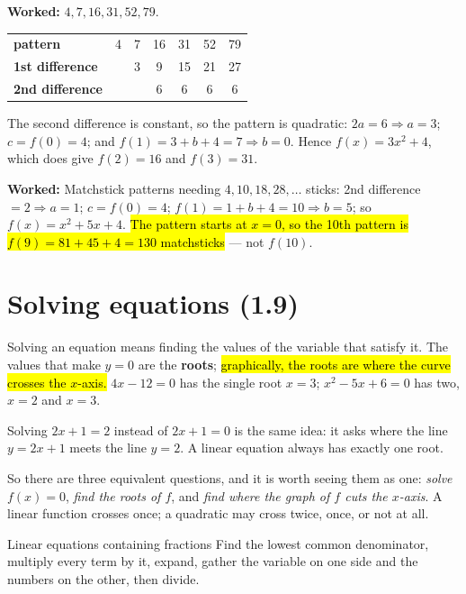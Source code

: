 \documentclass[11pt]{article}
\newcommand{\key}[1]{\hl{#1}}
\newcommand{\wex}[1]{\textbf{\color{lilacdeep}Worked:} #1}
\begin{document}
\wex{$4,7,16,31,52,79$.}

\vspace{-0.5em}
\begin{center}
\begin{tabular}{@{}l|cccccc@{}}
\textbf{pattern} & 4 & 7 & 16 & 31 & 52 & 79\\
\textbf{1st difference} & & 3 & 9 & 15 & 21 & 27\\
\textbf{2nd difference} & & & 6 & 6 & 6 & 6\\
\end{tabular}
\end{center}
\vspace{-0.3em}

The second difference is constant, so the pattern is quadratic: $2a=6\Rightarrow a=3$; $c=f(0)=4$; and $f(1)=3+b+4=7\Rightarrow b=0$. Hence $f(x)=3x^{2}+4$, which does give $f(2)=16$ and $f(3)=31$.

\wex{Matchstick patterns needing $4,10,18,28,\dots$ sticks: 2nd difference $=2\Rightarrow a=1$; $c=f(0)=4$; $f(1)=1+b+4=10\Rightarrow b=5$; so $f(x)=x^{2}+5x+4$. \key{The pattern starts at \mbox{$x=0$}, so the 10th pattern is \mbox{$f(9)=81+45+4=130$} matchsticks} --- not $f(10)$.}

\section{Solving equations (1.9)}

Solving an equation means finding the values of the variable that satisfy it. The values that make $y=0$ are the \textbf{roots}; \key{graphically, the roots are where the curve crosses the \mbox{$x$}-axis.} $4x-12=0$ has the single root $x=3$; $x^{2}-5x+6=0$ has two, $x=2$ and $x=3$.

Solving $2x+1=2$ instead of $2x+1=0$ is the same idea: it asks where the line $y=2x+1$ meets the line $y=2$. A linear equation always has exactly one root.

So there are three equivalent questions, and it is worth seeing them as one: \emph{solve $f(x)=0$}, \emph{find the roots of $f$}, and \emph{find where the graph of $f$ cuts the $x$-axis}. A linear function crosses once; a quadratic may cross twice, once, or not at all.

\begin{methodbox}{Linear equations containing fractions}
Find the lowest common denominator, multiply every term by it, expand, gather the variable on one side and the numbers on the other, then divide.
\end{methodbox}
\end{document}

